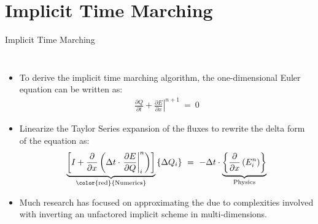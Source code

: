 \section{Implicit Time Marching}
\begin{frame}{Implicit Time Marching}
  \begin{columns}
    \begin{itemize}
      \item To derive the implicit time marching algorithm, the one-dimensional Euler equation 
            can be written as:
 			\begin{equation}
				\begin{split}
					\label{eq:Implicit_Scheme}
  					\frac{\partial{Q}}{\partial{t}}
            +\left.\frac{\partial{E}}{\partial{x}}\right|^{n+1}~=~0
				\end{split}
			\end{equation}
      \item Linearize the Taylor Series expansion of the fluxes to rewrite the delta form of the
            equation as:
      \begin{equation}
        \underbrace{\left[I+\frac{\partial}{\partial{x}}\left(\Delta{t}\cdot
        \left.\frac{\partial{E}}{\partial{Q}}\right|_{i}^n
        \right)\right]}_{\text{{\color{red}{Numerics}}}}\left\{\Delta{Q_{i}}\right\}~=~
        -\Delta{t}\cdot
        \underbrace{\left\{\frac{\partial}{\partial{x}}\left(E_{i}^n
        \right)\right\}}_{\text{Physics}}            
      \end{equation}
    \item Much research has focused on approximating the {\color{red}{Numerics}} due to complexities 
        involved with inverting an unfactored implicit scheme in multi-dimensions.
    \end{itemize}   
  \end{columns}
\end{frame}

